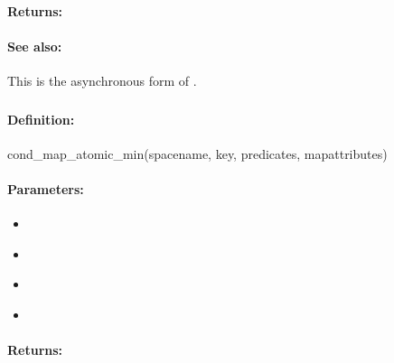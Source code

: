 \paragraph{Returns:}


\paragraph{See also:}  This is the asynchronous form of .

\pagebreak
\subsubsection{}
\label{api:ruby:cond_map_atomic_min}


\paragraph{Definition:}
\begin{rubycode}
cond_map_atomic_min(spacename, key, predicates, mapattributes)
\end{rubycode}

\paragraph{Parameters:}
\begin{itemize}[noitemsep]
\item {}\\

\item {}\\

\item {}\\

\item {}\\

\end{itemize}

\paragraph{Returns:}


